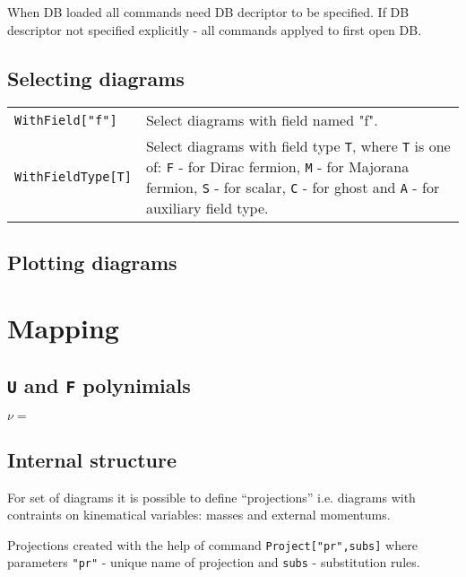 \documentclass[a4paper,11pt]{article}
\newcommand{\mma}[1]{\textcolor{BlueGreen}{\texttt{#1}}}
\begin{document}
When DB loaded all commands need DB decriptor to be specified. If DB
descriptor not specified explicitly - all commands applyed to first
open DB.

\subsection*{Selecting diagrams}

\begingroup
\renewcommand\arraystretch{2}
\begin{longtable}{p{4cm}|p{11cm}}
  \mma{WithField["f"]}
  & Select diagrams with field named "f".\\
  \mma{WithFieldType[T]}
  & Select diagrams with field type \texttt{T}, where \texttt{T} is
  one of: \texttt{F} - for Dirac fermion, \texttt{M} - for Majorana
  fermion, \texttt{S} - for scalar, \texttt{C} - for ghost and
  \texttt{A} - for auxiliary field type.\\
\end{longtable}
\endgroup

\subsection*{Plotting diagrams}


\section{Mapping}
\subsection{\texttt{U} and \texttt{F} polynimials}

$\mathcal{\nu}=$

\subsection{Internal structure}

For set of diagrams it is possible to define ``projections'' i.e.
diagrams with contraints on kinematical variables: masses and external
momentums.

Projections created with the help of command \texttt{Project["pr",subs]} where
parameters \texttt{"pr"} - unique name of projection and \texttt{subs}
- substitution rules.



 
\end{document}
